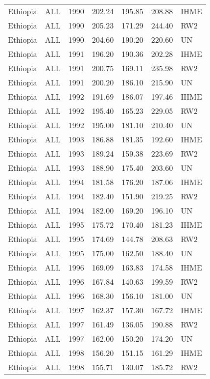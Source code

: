 \begin{longtable}{lllrrrl}
  Ethiopia & ALL & 1990 & 202.24 & 195.85 & 208.88 & IHME \\ 
  Ethiopia & ALL & 1990 & 205.23 & 171.29 & 244.40 & RW2 \\ 
  Ethiopia & ALL & 1990 & 204.60 & 190.20 & 220.60 & UN \\ 
  Ethiopia & ALL & 1991 & 196.20 & 190.36 & 202.28 & IHME \\ 
  Ethiopia & ALL & 1991 & 200.75 & 169.11 & 235.98 & RW2 \\ 
  Ethiopia & ALL & 1991 & 200.20 & 186.10 & 215.90 & UN \\ 
  Ethiopia & ALL & 1992 & 191.69 & 186.07 & 197.46 & IHME \\ 
  Ethiopia & ALL & 1992 & 195.40 & 165.23 & 229.05 & RW2 \\ 
  Ethiopia & ALL & 1992 & 195.00 & 181.10 & 210.40 & UN \\ 
  Ethiopia & ALL & 1993 & 186.88 & 181.35 & 192.60 & IHME \\ 
  Ethiopia & ALL & 1993 & 189.24 & 159.38 & 223.69 & RW2 \\ 
  Ethiopia & ALL & 1993 & 188.90 & 175.40 & 203.60 & UN \\ 
  Ethiopia & ALL & 1994 & 181.58 & 176.20 & 187.06 & IHME \\ 
  Ethiopia & ALL & 1994 & 182.40 & 151.90 & 219.25 & RW2 \\ 
  Ethiopia & ALL & 1994 & 182.00 & 169.20 & 196.10 & UN \\ 
  Ethiopia & ALL & 1995 & 175.72 & 170.40 & 181.23 & IHME \\ 
  Ethiopia & ALL & 1995 & 174.69 & 144.78 & 208.63 & RW2 \\ 
  Ethiopia & ALL & 1995 & 175.00 & 162.50 & 188.40 & UN \\ 
  Ethiopia & ALL & 1996 & 169.09 & 163.83 & 174.58 & IHME \\ 
  Ethiopia & ALL & 1996 & 167.84 & 140.63 & 199.59 & RW2 \\ 
  Ethiopia & ALL & 1996 & 168.30 & 156.10 & 181.00 & UN \\ 
  Ethiopia & ALL & 1997 & 162.37 & 157.30 & 167.72 & IHME \\ 
  Ethiopia & ALL & 1997 & 161.49 & 136.05 & 190.88 & RW2 \\ 
  Ethiopia & ALL & 1997 & 162.00 & 150.20 & 174.20 & UN \\ 
  Ethiopia & ALL & 1998 & 156.20 & 151.15 & 161.29 & IHME \\ 
  Ethiopia & ALL & 1998 & 155.71 & 130.07 & 185.72 & RW2 \\ 

\end{longtable}
